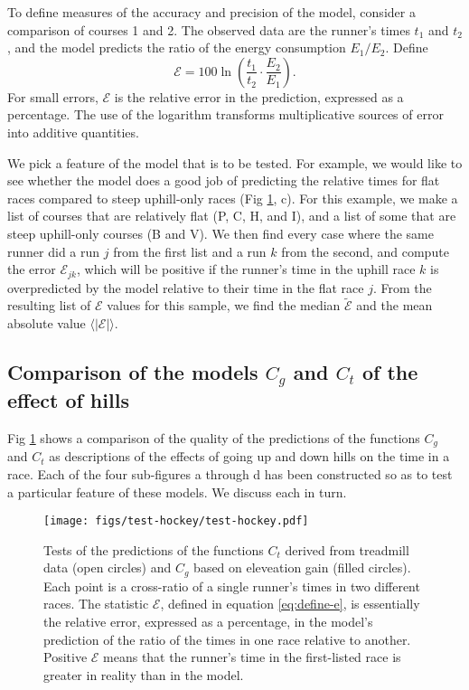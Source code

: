 \documentclass[10pt,letterpaper]{article}
\begin{document}
To define measures of the accuracy and precision of the model, consider a comparison
of courses 1 and 2. The observed data are the runner's times $t_1$ and $t_2$, and
the model predicts the ratio of the energy consumption $E_1/E_2$. Define
\begin{equation}\label{eq:define-e}
  \mathcal{E} = 100 \ln\left(\frac{t_1}{t_2}\cdot\frac{E_2}{E_1}\right).
\end{equation}
For small errors, $\mathcal{E}$ is the relative error in the prediction, expressed
as a percentage. The use of the logarithm transforms multiplicative sources of
error into additive quantities.

We pick a feature of the model that is to be tested. For example, we would like to see
whether the model does a good job of predicting the relative times for flat races
compared to steep uphill-only races (Fig \ref{fig:test-hockey}, c). For this example, we make a list of courses
that are relatively flat (P, C, H, and I), and a list of some that are steep uphill-only
courses (B and V). We then find every case where the same runner did a run $j$ from the first
list and a run $k$ from the second, and compute the error $\mathcal{E}_{jk}$, which will be
positive if the runner's time in the uphill race $k$ is overpredicted by the model relative
to their time in the flat race $j$. From the resulting list of $\mathcal{E}$ values for
this sample, we find the median $\widetilde{\mathcal{E}}$ and the mean absolute value $\langle|\mathcal{E}|\rangle$.

\subsection*{Comparison of the models $C_g$ and $C_t$ of the effect of hills}

Fig \ref{fig:test-hockey} shows a comparison of the quality of the predictions of the functions
$C_g$ and $C_t$ as descriptions of the effects of going up and down hills on the time in a race.
Each of the four sub-figures a through d has been constructed so as to test a particular
feature of these models. We discuss each in turn.

\begin{figure}[h]
\texttt{[image: figs/test-hockey/test-hockey.pdf]}
\centering
\caption{Tests of the predictions of the functions $C_t$ derived from treadmill data (open circles)
and $C_g$ based on eleveation gain (filled circles). Each point is a cross-ratio of a single runner's
times in two different races. The statistic $\mathcal{E}$, defined in equation \ref{eq:define-e},
is essentially the relative error, expressed as a percentage, in the model's prediction of the
ratio of the times in one race relative to another. Positive $\mathcal{E}$ means that the runner's
time in the first-listed race is greater in reality than in the model.
}
\label{fig:test-hockey}
\end{figure}
\end{document}

